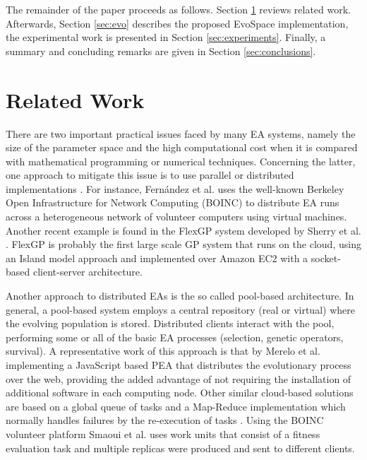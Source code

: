 The remainder of the paper proceeds as follows. Section \ref{sec:work} 
reviews related work. Afterwards, Section \ref{sec:evo} describes the
proposed EvoSpace implementation, the experimental work is presented in 
Section \ref{sec:experiments}. Finally, a summary and 
concluding remarks are given in Section \ref{sec:conclusions}.


\section{Related Work}
\label{sec:work}
There are two important practical issues faced by many EA systems, namely the size of the parameter 
space and the high computational cost when it is compared with mathematical programming or numerical techniques.
Concerning the latter, one approach to mitigate this issue is to use parallel or 
distributed implementations \cite{cantu-paz:migration-policies,duda2013gpu}.
For instance, Fern\'andez et al. \cite{nc} %
uses the well-known Berkeley Open Infrastructure for Network Computing (BOINC) to distribute EA runs across a
heterogeneous network of volunteer computers using virtual machines. Another recent example is 
found in the FlexGP system developed by Sherry et al. \cite{sherry2012flex}. FlexGP is probably the first large scale GP system 
that runs on the cloud, using an Island model approach and implemented over Amazon EC2 with a 
socket-based client-server architecture.

Another approach to distributed EAs is the so called pool-based architecture. In general, a 
pool-based system employs a central repository (real or virtual) where the evolving population is stored.
Distributed clients interact with the pool, performing some or all of the basic EA processes 
(selection, genetic operators, survival). A representative work of this approach 
is that by Merelo et al. \cite{agajaj} implementing a JavaScript based PEA that distributes 
the evolutionary process over the web, providing the added advantage of not requiring the 
installation of additional software in each computing node.  Other similar cloud-based solutions 
are based on a global queue of tasks and a Map-Reduce implementation which normally handles failures 
by the re-execution of  tasks \cite{fazenda2012,di2013towards,FlexGP}. Using the BOINC 
volunteer platform  Smaoui et al. \cite{FekiNG09} uses work units that consist of a fitness 
evaluation task and multiple replicas  were produced and sent to different clients.

